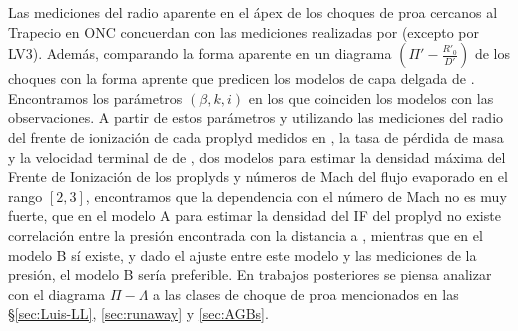Las mediciones del radio aparente en el ápex de los choques de proa cercanos al Trapecio en ONC concuerdan con las mediciones realizadas por \citet{Robberto:2005} (excepto por LV3). Además, comparando la forma aparente en un diagrama $(\Pi'-\frac{R'_0}{D'})$ de los choques con la forma aprente que predicen los modelos de capa delgada de \CRW{}. Encontramos los parámetros $(\beta, k, i)$ en los que coinciden los modelos con las observaciones. A partir de estos parámetros y utilizando las mediciones del radio del frente de ionización de cada proplyd medidos en \citet{HA:1998}, la tasa de pérdida de masa y la velocidad terminal de \thC{} de \citet{Gagne:2005}, dos modelos para estimar la densidad máxima del Frente de Ionización de los proplyds y números de Mach del flujo evaporado en el rango $[2, 3]$, encontramos que la dependencia con el número de Mach no es muy fuerte, que en el modelo A para estimar la densidad del IF del proplyd no existe correlación entre la presión encontrada con la distancia a \thC{}, mientras que en el modelo B sí existe, y dado el ajuste entre este modelo y las mediciones de la presión, el modelo B sería preferible. En trabajos posteriores se piensa analizar con el diagrama $\Pi-\Lambda$ a las clases de choque de proa mencionados en las \S \ref{sec:Luis-LL}, \ref{sec:runaway} y \ref{sec:AGBs}.